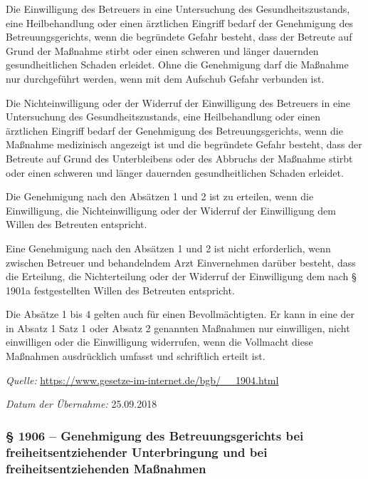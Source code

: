 \documentclass[pdftex,12pt,a4paper]{article}
\begin{document}
\begin{legal}

\item Die Einwilligung des Betreuers in eine Untersuchung des Gesundheitszustands, eine Heilbehandlung oder einen ärztlichen Eingriff bedarf der Genehmigung des Betreuungsgerichts, wenn die begründete Gefahr besteht, dass der Betreute auf Grund der Maßnahme stirbt oder einen schweren und länger dauernden gesundheitlichen Schaden erleidet. Ohne die Genehmigung darf die Maßnahme nur durchgeführt werden, wenn mit dem Aufschub Gefahr verbunden ist.

\item Die Nichteinwilligung oder der Widerruf der Einwilligung des Betreuers in eine Untersuchung des Gesundheitszustands, eine Heilbehandlung oder einen ärztlichen Eingriff bedarf der Genehmigung des Betreuungsgerichts, wenn die Maßnahme medizinisch angezeigt ist und die begründete Gefahr besteht, dass der Betreute auf Grund des Unterbleibens oder des Abbruchs der Maßnahme stirbt oder einen schweren und länger dauernden gesundheitlichen Schaden erleidet.

\item Die Genehmigung nach den Absätzen 1 und 2 ist zu erteilen, wenn die Einwilligung, die Nichteinwilligung oder der Widerruf der Einwilligung dem Willen des Betreuten entspricht.

\item Eine Genehmigung nach den Absätzen 1 und 2 ist nicht erforderlich, wenn zwischen Betreuer und behandelndem Arzt Einvernehmen darüber besteht, dass die Erteilung, die Nichterteilung oder der Widerruf der Einwilligung dem nach § 1901a festgestellten Willen des Betreuten entspricht.

\item Die Absätze 1 bis 4 gelten auch für einen Bevollmächtigten. Er kann in eine der in Absatz 1 Satz 1 oder Absatz 2 genannten Maßnahmen nur einwilligen, nicht einwilligen oder die Einwilligung widerrufen, wenn die Vollmacht diese Maßnahmen ausdrücklich umfasst und schriftlich erteilt ist.

\end{legal}


\textit{Quelle:} \url{https://www.gesetze-im-internet.de/bgb/__1904.html}

\textit{Datum der Übernahme:} 25.09.2018




\subsubsection*{§ 1906 -- Genehmigung des Betreuungsgerichts bei freiheitsentziehender Unterbringung und bei freiheitsentziehenden Maßnahmen}
\end{document}
